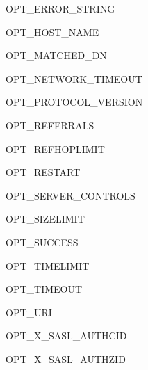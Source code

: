 \begin{datadesc}{OPT_ERROR_STRING}
\end{datadesc}

\begin{datadesc}{OPT_HOST_NAME}
\end{datadesc}

\begin{datadesc}{OPT_MATCHED_DN}
\end{datadesc}

\begin{datadesc}{OPT_NETWORK_TIMEOUT}
\end{datadesc}

\begin{datadesc}{OPT_PROTOCOL_VERSION}
\end{datadesc}

\begin{datadesc}{OPT_REFERRALS}
\end{datadesc}

\begin{datadesc}{OPT_REFHOPLIMIT}
\end{datadesc}

\begin{datadesc}{OPT_RESTART}
\end{datadesc}

\begin{datadesc}{OPT_SERVER_CONTROLS}
\end{datadesc}

\begin{datadesc}{OPT_SIZELIMIT}
\end{datadesc}

\begin{datadesc}{OPT_SUCCESS}
\end{datadesc}

\begin{datadesc}{OPT_TIMELIMIT}
\end{datadesc}

\begin{datadesc}{OPT_TIMEOUT}
\end{datadesc}

\begin{datadesc}{OPT_URI}
\end{datadesc}

\begin{datadesc}{OPT_X_SASL_AUTHCID}
\end{datadesc}

\begin{datadesc}{OPT_X_SASL_AUTHZID}
\end{datadesc}

